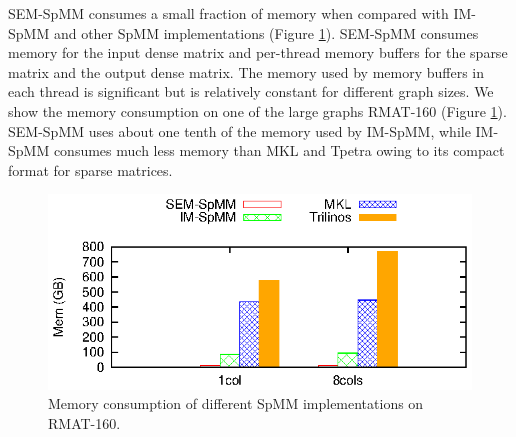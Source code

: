 SEM-SpMM consumes a small fraction of memory when compared with IM-SpMM and
other SpMM implementations (Figure \ref{perf:spmm_mem}). SEM-SpMM consumes
memory for the input dense matrix and per-thread memory buffers for the sparse
matrix and the output dense matrix. The memory used by memory buffers
in each thread is significant
but is relatively constant for different graph sizes. We show the memory
consumption on one of the large graphs RMAT-160 (Figure \ref{perf:spmm_mem}).
SEM-SpMM uses about one tenth of the memory used by IM-SpMM, while IM-SpMM
consumes much less memory than MKL and Tpetra owing to its compact format for
sparse matrices.

\begin{figure}
	\begin{center}
		\footnotesize
		\includegraphics[scale=1]{SpMM_figs/SpMM-mem.eps}
		\caption{Memory consumption of different SpMM implementations on
		RMAT-160.}
		\label{perf:spmm_mem}
	\end{center}
\end{figure}


